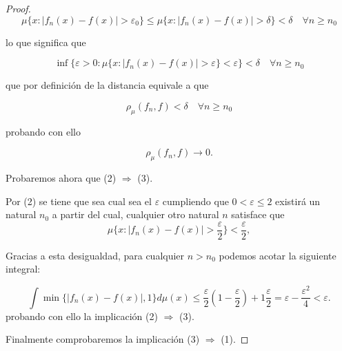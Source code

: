 \begin{proof}
    \begin{equation}
        \mu \{ x : |f_n(x) - f(x)| > \varepsilon_0 \}
        \leq
        \mu \{ x : |f_n(x) - f(x)| > \delta\}
        < \delta 
        \quad 
        \forall n \geq n_0
    \end{equation}

    lo que significa que 
    
    \begin{equation}
        \inf \{ \varepsilon > 0:
         \mu \{ 
             x : |f_n(x) - f(x)| > \varepsilon \} < \varepsilon 
             \} 
        < \delta 
        \quad 
        \forall n \geq n_0
    \end{equation}

    que por definición de la distancia equivale a que 

    \begin{equation}
        \rho_{\mu}(f_n, f) < \delta \quad \forall n \geq n_0
    \end{equation}

    probando con ello 

    \begin{equation}
        \rho_{\mu}(f_n, f) \longrightarrow 0. 
    \end{equation}

    Probaremos ahora que (2) $\Longrightarrow$ (3).   

    Por (2) se tiene que sea cual sea el $\varepsilon$ cumpliendo que 
    $0 < \varepsilon \leq 2$ 
    existirá un natural $n_0$ a partir del cual, cualquier otro natural $n$ 
    satisface que 
    \begin{equation} 
        \mu \{  
            x : |f_n(x) - f(x)| > \frac{\varepsilon}{2}  
            \}  
        < 
        \frac{\varepsilon}{2},  
    \end{equation}

    Gracias a esta desigualdad, para cualquier $n > n_0$ podemos acotar la siguiente integral: 

    \begin{equation}
        \int \min \{ |f_n(x) - f(x)|, 1\} d\mu(x) 
        \leq
        \frac{\varepsilon}{2} (1-\frac{\varepsilon}{2}) + 1\frac{\varepsilon}{2} 
         = \varepsilon - \frac{\varepsilon^2}{4} <  \varepsilon.  
    \end{equation}
    probando con ello la implicación (2) $\Longrightarrow$ (3).

    Finalmente comprobaremos la implicación (3) $\Longrightarrow$ (1).


\end{proof}
